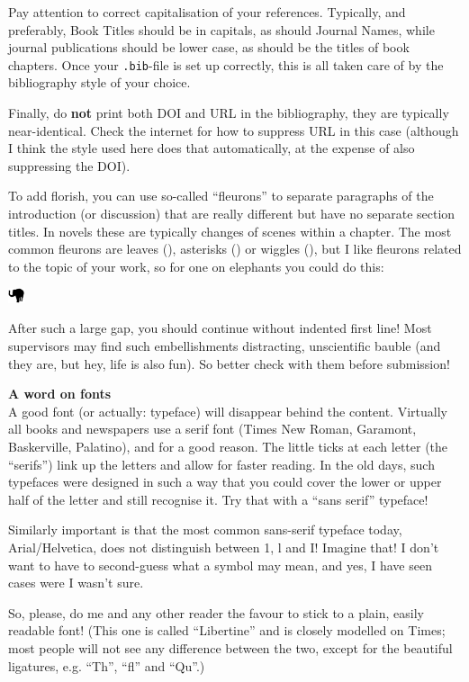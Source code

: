 \begin{boxmd}
	Pay attention to correct capitalisation of your references. Typically, and preferably, Book Titles should be in capitals, as should Journal Names, while journal publications should be lower case, as should be the titles of book chapters. Once your \texttt{.bib}-file is set up correctly, this is all taken care of by the bibliography style of your choice.
	
	Finally, do \textbf{not} print both DOI and URL in the bibliography, they are typically near-identical. Check the internet for how to suppress URL in this case (although I think the style used here does that automatically, at the expense of also suppressing the DOI).
\end{boxmd}



To add florish, you can use so-called ``fleurons'' to separate paragraphs of the introduction (or discussion) that are really different but have no separate section titles. In novels these are typically changes of scenes within a chapter. The most common fleurons are leaves (\adfhangingflatleafright), asterisks () or wiggles (),
but I like fleurons related to the topic of your work, so for one on elephants you could do this: 

{\centering
	\includegraphics[width=0.5cm]{images/elephant.png}
	
}

\noindent After such a large gap, you should continue without indented first line! Most supervisors may find such embellishments distracting, unscientific bauble (and they are, but hey, life is also fun). So better check with them before submission!



\begin{boxmd}
	\textbf{A word on fonts}\\
	A good font (or actually: typeface) will disappear behind the content. Virtually all books and newspapers use a serif font (Times New Roman, Garamont, Baskerville, Palatino), and for a good reason. The little ticks at each letter (the ``serifs'') link up the letters and allow for faster reading. In the old days, such typefaces were designed in such a way that you could cover the lower or upper half of the letter and still recognise it. Try that with a ``sans serif'' typeface!
	
	Similarly important is that the most common sans-serif typeface today, Arial/Helvetica, does not distinguish between 1, l and I! Imagine that! I don't want to have to second-guess what a symbol may mean, and yes, I have seen cases were I wasn't sure.
	
	So, please, do me and any other reader the favour to stick to a plain, easily readable font! (This one is called ``Libertine'' and is closely modelled on Times; most people will not see any difference between the two, except for the beautiful ligatures, e.g. ``Th'', ``fl'' and ``Qu''.)
\end{boxmd}


